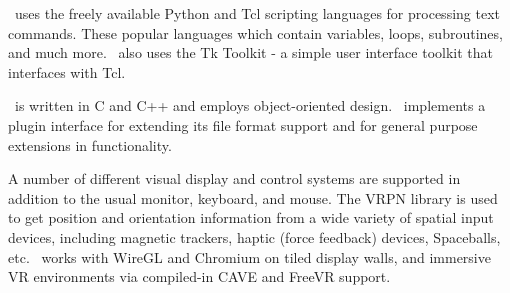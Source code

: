 \begin{itemize}
\VMD\ uses the freely available Python and Tcl scripting languages 
for processing text commands.  These popular languages which contain
variables, loops, subroutines, and much more.
\VMD\ also uses the Tk Toolkit - a simple user interface toolkit 
that interfaces with Tcl.

\VMD\ is written in C and C++ and employs object-oriented design.
\VMD\ implements a plugin interface for extending its file format
support and for general purpose extensions in functionality.

A number of different visual display and control systems are
supported in addition to the usual monitor, keyboard, and mouse.  
The VRPN library\mycite{}{} is used to get position and orientation
information from a wide variety of spatial input devices, including 
magnetic trackers, haptic (force feedback) devices, Spaceballs, etc.
\VMD\ works with WireGL and Chromium on tiled display walls,
and immersive VR environments via compiled-in CAVE and FreeVR support.


\end{itemize}








